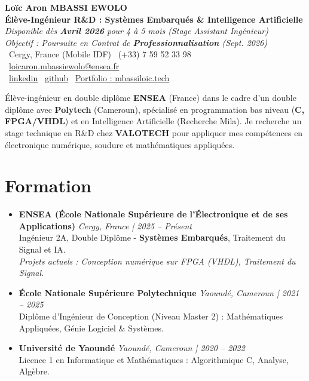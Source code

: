 \documentclass[a4paper,11pt]{article}
\begin{document}
\begin{center}
    {\Large \textbf{Loïc Aron MBASSI EWOLO}} \\ \vspace{4pt}
    \textbf{\large Élève-Ingénieur R\&D : Systèmes Embarqués \& Intelligence Artificielle} \\
    \textit{\small Disponible dès\textbf{ Avril 2026} pour 4 à 5 mois (Stage Assistant Ingénieur)} \\
    \textit{\small Objectif : Poursuite en Contrat de \textbf{Professionnalisation} (Sept. 2026)} \\ \vspace{4pt}
    \small
    \faMapMarker\ Cergy, France (Mobile IDF) \quad
    \faPhone\ (+33) 7 59 52 33 98 \quad
    \faEnvelope\ \href{mailto:loicaron.mbassiewolo@ensea.fr}{loicaron.mbassiewolo@ensea.fr} \\ \vspace{2pt}
    \faLinkedin\ \href{https://www.linkedin.com/in/loic-mbassi/}{linkedin} \quad
    \faGithub\ \href{https://github.com/Nameless0l}{github} \quad
    \faGlobe\ \href{https://mbassiloic.tech/\#portfolio}{Portfolio : mbassiloic.tech}
\end{center}

\vspace{-6pt}

\noindent\small{Élève-ingénieur en double diplôme \textbf{ENSEA} (France) dans le cadre d'un double diplôme avec \textbf{Polytech} (Cameroun), spécialisé en programmation bas niveau (\textbf{C, FPGA/VHDL}) et en Intelligence Artificielle (Recherche Mila). Je recherche un stage technique en R\&D chez \textbf{VALOTECH} pour appliquer mes compétences en électronique numérique, soudure et mathématiques appliquées.}

\section{Formation}
\begin{itemize}[leftmargin=*, label={.}, nosep]
    \item \textbf{ENSEA (École Nationale Supérieure de l'Électronique et de ses Applications)} \hfill \textit{Cergy, France | 2025 -- Présent} \\
    \small{Ingénieur 2A, Double Diplôme - \textbf{Systèmes Embarqués}, Traitement du Signal et IA.} \\
    \textit{\small{Projets actuels : Conception numérique sur FPGA (VHDL), Traitement du Signal.}}
    \vspace{2pt}
    \item \textbf{École Nationale Supérieure Polytechnique} \hfill \textit{Yaoundé, Cameroun | 2021 -- 2025} \\
    \small{Diplôme d'Ingénieur de Conception (Niveau Master 2) : Mathématiques Appliquées, Génie Logiciel \& Systèmes.}
    \item \textbf{Université de Yaoundé} \hfill \textit{Yaoundé, Cameroun | 2020 -- 2022} \\
    \small{Licence 1 en Informatique et Mathématiques : Algorithmique C, Analyse, Algèbre.}
\end{itemize}
\end{document}
